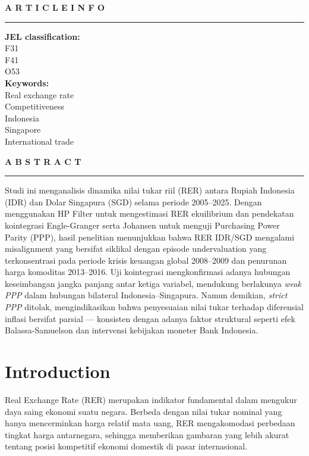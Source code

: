 \documentclass[12pt]{article}
\begin{document}
\begin{minipage}[t]{0.28\textwidth}
\raggedright
\textbf{A R T I C L E \quad I N F O}\\[0.3cm]
\hrule
\vspace{0.3cm}
\textbf{JEL classification:}\\[0.15cm]
F31\\
F41\\
O53\\[0.4cm]
\textbf{Keywords:}\\[0.15cm]
Real exchange rate\\
Competitiveness\\
Indonesia\\
Singapore\\
International trade
\end{minipage}
\hfill
\begin{minipage}[t]{0.66\textwidth}
\raggedright
\textbf{A B S T R A C T}\\[0.3cm]
\hrule
\vspace{0.3cm}
Studi ini menganalisis dinamika nilai tukar riil (RER) antara Rupiah Indonesia (IDR) 
dan Dolar Singapura (SGD) selama periode 2005--2025. Dengan menggunakan HP Filter 
untuk mengestimasi RER ekuilibrium dan pendekatan kointegrasi Engle-Granger serta 
Johansen untuk menguji Purchasing Power Parity (PPP), hasil penelitian menunjukkan 
bahwa RER IDR/SGD mengalami misalignment yang bersifat siklikal dengan episode 
undervaluation yang terkonsentrasi pada periode krisis keuangan global 2008--2009 
dan penurunan harga komoditas 2013--2016. Uji kointegrasi mengkonfirmasi adanya 
hubungan keseimbangan jangka panjang antar ketiga variabel, mendukung berlakunya 
\textit{weak PPP} dalam hubungan bilateral Indonesia--Singapura. Namun demikian, 
\textit{strict PPP} ditolak, mengindikasikan bahwa penyesuaian nilai tukar terhadap 
diferensial inflasi bersifat parsial --- konsisten dengan adanya faktor struktural 
seperti efek Balassa-Samuelson dan intervensi kebijakan moneter Bank Indonesia.
\end{minipage}

\vspace{0.8cm}


\section{Introduction}

Real Exchange Rate (RER) merupakan indikator fundamental dalam mengukur daya saing ekonomi suatu negara. Berbeda dengan nilai tukar nominal yang hanya mencerminkan harga relatif mata uang, RER mengakomodasi perbedaan tingkat harga antarnegara, sehingga memberikan gambaran yang lebih akurat tentang posisi kompetitif ekonomi domestik di pasar internasional.
\end{document}

